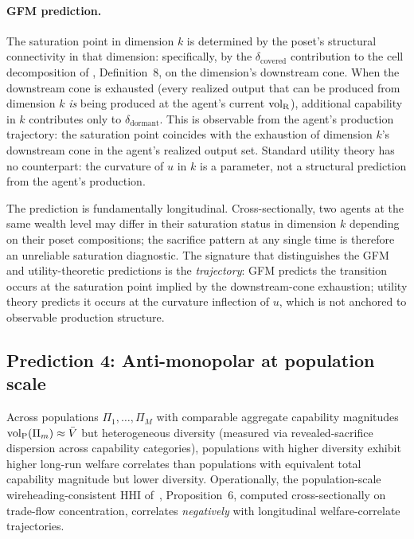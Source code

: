 \paragraph{GFM prediction.}
The saturation point in dimension $k$ is determined by the poset's
structural connectivity in that dimension: specifically, by the
$\delta_{\mathrm{covered}}$ contribution to the cell decomposition
of \citep[Need~Sufficiency]{lasser2026paper8b}, Definition~8, on
the dimension's downstream cone.  When the downstream cone is
exhausted (every realized output that can be produced from
dimension $k$ \emph{is} being produced at the agent's current
${\operatorname{vol}_{\mathrm{R}}}$), additional capability in $k$ contributes only to
$\delta_{\mathrm{dormant}}$.  This is observable from the agent's
production trajectory: the saturation point coincides with the
exhaustion of dimension $k$'s downstream cone in the agent's
realized output set.  Standard utility theory has no
counterpart: the curvature of $u$ in $k$ is a parameter, not a
structural prediction from the agent's production.

\begin{remark}
\label{rem:saturation_longitudinal}
The prediction is fundamentally longitudinal.  Cross-sectionally,
two agents at the same wealth level may differ in their
saturation status in dimension $k$ depending on their poset
compositions; the sacrifice pattern at any single time is
therefore an unreliable saturation diagnostic.  The signature
that distinguishes the GFM and utility-theoretic predictions is the
\emph{trajectory}: GFM predicts the transition occurs at the
saturation point implied by the downstream-cone exhaustion;
utility theory predicts it occurs at the curvature inflection of
$u$, which is not anchored to observable production structure.
\end{remark}

\subsection{Prediction 4: Anti-monopolar at population scale}
\label{sec:pred_anti_monopolar}

\begin{prediction}
\label{pred:anti_monopolar}
Across populations $\Pi_1, \dots, \Pi_M$ with comparable
aggregate capability magnitudes ${\operatorname{vol}_{\mathrm{P}}}(\Pi_m) \approx \bar V$ but
heterogeneous diversity (measured via revealed-sacrifice dispersion
across capability categories), populations with higher diversity
exhibit higher long-run welfare correlates than populations with
equivalent total capability magnitude but lower diversity.
Operationally, the population-scale wireheading-consistent HHI
of~\citep[Need~Sufficiency]{lasser2026paper8b}, Proposition~6,
computed cross-sectionally on trade-flow concentration, correlates
\emph{negatively} with longitudinal welfare-correlate trajectories.
\end{prediction}

